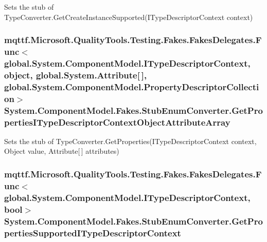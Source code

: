 Sets the stub of Type\-Converter.\-Get\-Create\-Instance\-Supported(\-I\-Type\-Descriptor\-Context context)

\hypertarget{class_system_1_1_component_model_1_1_fakes_1_1_stub_enum_converter_ac57166f5b62ae4f61952d9d3d60bb5dd}{
\subsubsection[{Get\-Properties\-I\-Type\-Descriptor\-Context\-Object\-Attribute\-Array}]{\setlength{\rightskip}{0pt plus 5cm}mqttf.\-Microsoft.\-Quality\-Tools.\-Testing.\-Fakes.\-Fakes\-Delegates.\-Func$<$global.\-System.\-Component\-Model.\-I\-Type\-Descriptor\-Context, object, global.\-System.\-Attribute\mbox{[}$\,$\mbox{]}, global.\-System.\-Component\-Model.\-Property\-Descriptor\-Collection$>$ System.\-Component\-Model.\-Fakes.\-Stub\-Enum\-Converter.\-Get\-Properties\-I\-Type\-Descriptor\-Context\-Object\-Attribute\-Array}}\label{class_system_1_1_component_model_1_1_fakes_1_1_stub_enum_converter_ac57166f5b62ae4f61952d9d3d60bb5dd}


Sets the stub of Type\-Converter.\-Get\-Properties(\-I\-Type\-Descriptor\-Context context, Object value, Attribute\mbox{[}$\,$\mbox{]} attributes)

\hypertarget{class_system_1_1_component_model_1_1_fakes_1_1_stub_enum_converter_abf78ea2252643dd04b637536b9a925ab}{
\subsubsection[{Get\-Properties\-Supported\-I\-Type\-Descriptor\-Context}]{\setlength{\rightskip}{0pt plus 5cm}mqttf.\-Microsoft.\-Quality\-Tools.\-Testing.\-Fakes.\-Fakes\-Delegates.\-Func$<$global.\-System.\-Component\-Model.\-I\-Type\-Descriptor\-Context, bool$>$ System.\-Component\-Model.\-Fakes.\-Stub\-Enum\-Converter.\-Get\-Properties\-Supported\-I\-Type\-Descriptor\-Context}}\label{class_system_1_1_component_model_1_1_fakes_1_1_stub_enum_converter_abf78ea2252643dd04b637536b9a925ab}


